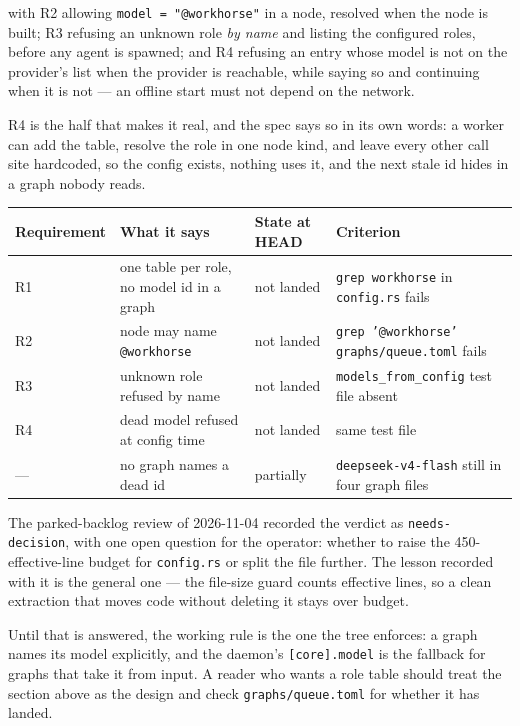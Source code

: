 with R2 allowing \texttt{model = "@workhorse"} in a node, resolved when the node is built; R3
refusing an unknown role \emph{by name} and listing the configured roles, before any agent is
spawned; and R4 refusing an entry whose model is not on the provider's list when the provider
is reachable, while saying so and continuing when it is not --- an offline start must not
depend on the network.

R4 is the half that makes it real, and the spec says so in its own words: a worker can add the
table, resolve the role in one node kind, and leave every other call site hardcoded, so the
config exists, nothing uses it, and the next stale id hides in a graph nobody reads.

\begin{longtable}{@{}p{}p{}p{}p{}@{}}
\toprule
\textbf{Requirement} & \textbf{What it says} & \textbf{State at HEAD} & \textbf{Criterion} \\
\midrule
\endhead
R1 & one table per role, no model id in a graph & not landed & \texttt{grep workhorse} in
\texttt{config.rs} fails \\
R2 & node may name \texttt{@workhorse} & not landed & \texttt{grep '@workhorse' graphs/queue.toml}
fails \\
R3 & unknown role refused by name & not landed & \texttt{models\_from\_config} test file absent \\
R4 & dead model refused at config time & not landed & same test file \\
--- & no graph names a dead id & partially & \texttt{deepseek-v4-flash} still in four graph files \\
\bottomrule
\end{longtable}

The parked-backlog review of 2026-11-04 recorded the verdict as \texttt{needs-decision}, with
one open question for the operator: whether to raise the 450-effective-line budget for
\texttt{config.rs} or split the file further. The lesson recorded with it is the general one
--- the file-size guard counts effective lines, so a clean extraction that moves code without
deleting it stays over budget.

Until that is answered, the working rule is the one the tree enforces: a graph names its model
explicitly, and the daemon's \texttt{[core].model} is the fallback for graphs that take it
from input. A reader who wants a role table should treat the section above as the design and
check \texttt{graphs/queue.toml} for whether it has landed.

